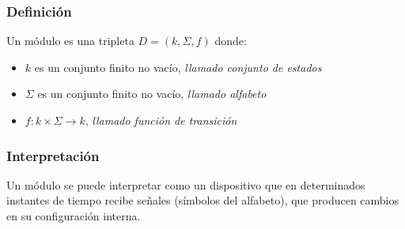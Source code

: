 \subsubsection*{Definición}
Un módulo es una tripleta $D=(k,\Sigma,f)$ donde:
\begin{itemize}
\item $k$ es un conjunto finito no vacío, \textit{llamado conjunto de estados}
\item $\Sigma$ es un conjunto finito no vacío, \textit{llamado alfabeto}
\item $f:k\times\Sigma\rightarrow k$, \textit{llamado función de transición}
\end{itemize}
\subsubsection*{Interpretación}
Un módulo se puede interpretar como un dispositivo que en determinados instantes de tiempo recibe señales (símbolos del alfabeto), que producen cambios en su configuración interna.
\begin{center}
\end{center}
